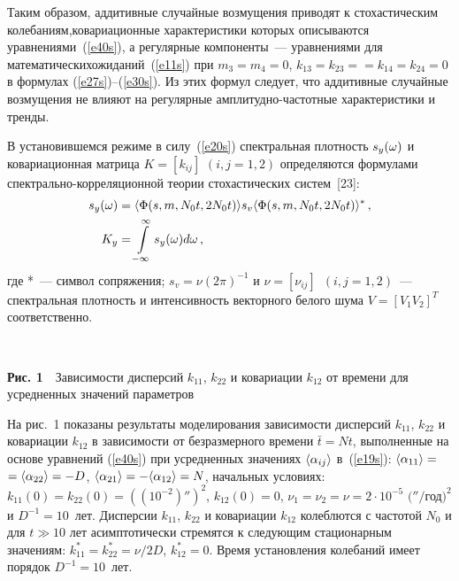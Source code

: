 \begin{multicols}{2}
Таким образом, аддитивные случайные возмущения приводят к
стохастическим колебаниям,\linebreak ковариационные характеристики которых
описываются уравнениями~(\ref{e40s}), а регулярные компоненты~--- уравнениями
для математических\linebreak ожиданий~(\ref{e11s}) при $m_3 = m_4 =0$, $ k_{13}=
k_{23} =$\linebreak$= k_{14} =k_{24}=0$ в формулах (\ref{e27s})--(\ref{e30s}). Из этих формул
следует, что аддитивные случайные возмущения не влияют на регулярные
амплитудно-час\-тот\-ные характеристики и тренды.

В установившемся режиме в силу~(\ref{e20s}) спектральная плотность $s_y
(\omega)$ и ковариационная матрица $K= [ k_{ij}]$ $(i, j=1,2)$
определяются формулами спектрально-корреляционной теории
стохастических систем~[23]:
\begin{align*}
s_y(\w) &= \langle \Phi (s, m, N_0 t, 2 N_0 t)\rangle s_v \langle
\Phi (s, m, N_0 t, 2 N_0 t)\rangle^*\,,\\ %
K_y &=\int\limits_{-\infty}^\infty s_y(\w) d\w\,, %
\end{align*}
где *~--- символ сопряжения; $s_v =\nu (2\pi)^{-1}$ и $\nu =
[ \nu_{ij}]$\ $( i, j=1,2)$~--- спектральная плотность и
интенсивность векторного белого шума $V= [ V_1 V_2 ]^T$
соответственно.
\medskip

\vspace*{1pt}
\begin{center}
\mbox{%
\epsfxsize=79.139mm
}
\end{center}
\vspace*{3pt}
{\small
\textbf{Рис. 1}\ \ Зависимости дисперсий $k_{11}$, $k_{22}$ и
ковариации $k_{12}$
 от времени для усредненных значений параметров}
\bigskip
\addtocounter{figure}{1}

На рис.~1 показаны результаты моделирования зависимости дисперсий
$k_{11}$, $k_{22}$ и ко\-ва\-риа\-ции $k_{12}$ в зависимости от
безразмерного време\-ни $\bar t = Nt$, выполненные на основе
уравнений (\ref{e40s}) при усредненных значениях $\langle\alpha_{ij}\rangle$ в~(\ref{e19s}):
 $\langle\alpha_{11}\rangle=$\linebreak$=\langle\alpha_{22}\rangle=-D$,
 $\langle\alpha_{21}\rangle =-\langle\alpha_{12}\rangle=N$,
начальных условиях:
 $k_{11} (0) = k_{22} (0) =( (10^{-2})'')^2$, $k_{12}(0) =0$,
 $\nu_1 =\nu_2=\nu = 2\cdot 10^{-5}$ $(''/$год$)^2$ и $D^{-1} =
 10$~лет. Дисперсии $k_{11}$,
 $k_{22}$ и ковариации $k_{12}$ колеблются с частотой $N_0$ и для $t\gg 10$ лет
 асимптотически стремятся к следующим стационарным значениям: $k_{11}^* =
 k_{22}^*= \nu/2D$, $ k_{12}^*=0$. Время установления колебаний
 имеет порядок $D^{-1}=10$~лет.



\end{multicols}

